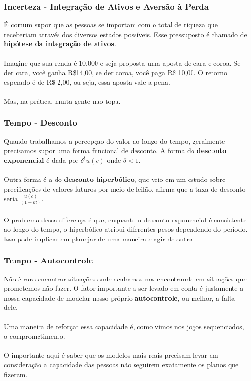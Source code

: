 \documentclass{beamer}[10]
\begin{document}
\begin{frame}
	\frametitle{Incerteza - Integração de Ativos e Aversão à Perda}

	É comum supor que as pessoas se importam com o total de riqueza que receberiam através dos diversos estados possíveis. Esse pressuposto é chamado de \textbf{hipótese da integração de ativos}.
	\\~\\
	Imagine que sua renda é 10.000 e seja proposta uma aposta de cara e coroa. Se der cara, você ganha R\$14,00, se der coroa, você paga R\$ 10,00. O retorno esperado é de R\$ 2,00, ou seja, essa aposta vale a pena. 
	\\~\\
	Mas, na prática, muita gente não topa.

\end{frame}

\begin{frame}
	\frametitle{Tempo - Desconto}

	Quando trabalhamos a percepção do valor ao longo do tempo, geralmente precisamos supor uma forma funcional de desconto. A forma do \textbf{desconto exponencial} é dada por $\delta^t u(c)$ onde $\delta < 1$. 
	\\~\\
	Outra forma é a do \textbf{desconto hiperbólico}, que veio em um estudo sobre precificações de valores futuros por meio de leilão, afirma que a taxa de desconto seria $\frac{u(c)}{(1+kt)}$.
	\\~\\
	O problema dessa diferença é que, enquanto o desconto exponencial é consistente ao longo do tempo, o hiperbólico atribui diferentes pesos dependendo do período. Isso pode implicar em planejar de uma maneira e agir de outra.

\end{frame}

\begin{frame}
	\frametitle{Tempo - Autocontrole}

	Não é raro encontrar situações onde acabamos nos encontrando em situações que prometemos não fazer. O fator importante a ser levado em conta é justamente a nossa capacidade de modelar nosso próprio \textbf{autocontrole}, ou melhor, a falta dele.
	\\~\\
	Uma maneira de reforçar essa capacidade é, como vimos nos jogos sequenciados, o comprometimento.
	\\~\\
	O importante aqui é saber que os modelos mais reais precisam levar em consideração a capacidade das pessoas não seguirem exatamente os planos que fizeram.

\end{frame}
\end{document}
